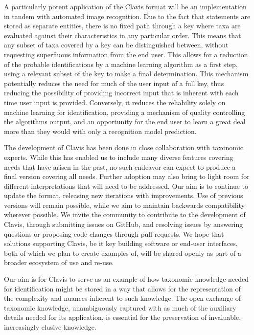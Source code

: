 \documentclass[10pt,letterpaper]{article}
\begin{document}
A particularly potent application of the Clavis format will be an implementation in tandem with automated image recognition. Due to the fact that statements are stored as separate entities, there is no fixed path through a key where taxa are evaluated against their characteristics in any particular order. This means that any subset of taxa covered by a key can be distinguished between, without requesting superfluous information from the end user. This allows for a reduction of the probable identifications by a machine learning algorithm as a first step, using a relevant subset of the key to make a final determination. This mechanism potentially reduces the need for much of the user input of a full key, thus reducing the possibility of providing incorrect input that is inherent with each time user input is provided. Conversely, it reduces the reliability solely on machine learning for identification, providing a mechanism of quality controlling the algorithms output, and an opportunity for the end user to learn a great deal more than they would with only a recognition model prediction.

The development of Clavis has been done in close collaboration with taxonomic experts. While this has enabled us to include many diverse features covering needs that have arisen in the past, no such endeavor can expect to produce a final version covering all needs. Further adoption may also bring to light room for different interpretations that will need to be addressed. Our aim is to continue to update the format, releasing new iterations with improvements. Use of previous versions will remain possible, while we aim to maintain backwards compatibility wherever possible. We invite the community to contribute to the development of Clavis, through submitting issues on GitHub, and resolving issues by answering questions or proposing code changes through pull requests. We hope that solutions supporting Clavis, be it key building software or end-user interfaces, both of which we plan to create examples of, will be shared openly as part of a broader ecosystem of use and re-use.

Our aim is for Clavis to serve as an example of how taxonomic knowledge needed for identification might be stored in a way that allows for the representation of the complexity and nuances inherent to such knowledge. The open exchange of taxonomic knowledge, unambiguously captured with as much of the auxiliary details needed for its application, is essential for the preservation of invaluable, increasingly elusive knowledge.
\end{document}
